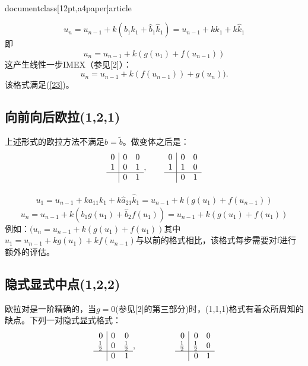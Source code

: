 \\documentclass[12pt,a4paper]{article}
\begin{document}
\begin{equation*}
u_{n}=u_{n-1}+k(b_{1}k_{1}+\hat{b}_{1}\hat{k}_{1})=u_{n-1}+kk_{1}+k\hat{k}_{1}
\end{equation*}
即
\begin{equation*}
u_{n}=u_{n-1}+k(g(u_{1})+f(u_{n-1}))
\end{equation*}
这产生线性一步IMEX（参见[2]）：
\begin{equation}
u_{n}=u_{n-1}+k(f(u_{n-1}))+g(u_{n})).
\end{equation}
该格式满足(\ref{23})。

\subsection{向前向后欧拉(1,2,1)}

上述形式的欧拉方法不满足$\widehat{b}=\tilde{b}$。做变体之后是：
\[
\begin{array}{r|rr}
0 & 0 & 0\\
1 & 0 & 1 \\
\hline
& 0 & 1
\end{array},~~~~~~
\begin{array}{r|rr}
0 & 0 & 0\\
1 & 1 & 0 \\
\hline
& 0 & 1
\end{array}
\]

\begin{gather}
u_{1}=u_{n-1}+ka_{11}k_{1}+k\hat{a}_{21}\hat{k}_{1}=u_{n-1}+k(g(u_{1})+f(u_{n-1}))
\end{gather}
\begin{equation*}
u_{n}=u_{n-1}+k(b_{1}g(u_{1})+\hat{b}_{2}f(u_{1}))=u_{n-1}+k(g(u_{1})+f(u_{1}))
\end{equation*}
例如：$(u_{n}=u_{n-1}+k(g(u_{1})+f(u_{1}))$其中$u_{1}=u_{n-1}+kg(u_{1})+kf(u_{n-1})$与以前的格式相比，该格式每步需要对f进行额外的评估。

\subsection{隐式显式中点(1,2,2)}
欧拉对是一阶精确的，当$g=0$(参见[2]的第三部分)时，(1,1,1)格式有着众所周知的缺点。下列一对隐式显式格式：
\[
\begin{array}{r|rr}
0 & 0 & 0\\
\frac{1}{2} & 0 & \frac{1}{2}\\
\hline
& 0 & 1
\end{array},~~~~~~~~~~~~~~
\begin{array}{r|rr}
0 & 0 & 0\\
\frac{1}{2} & \frac{1}{2} & 0\\
\hline
& 0 & 1
\end{array}
\]
\end{document}
